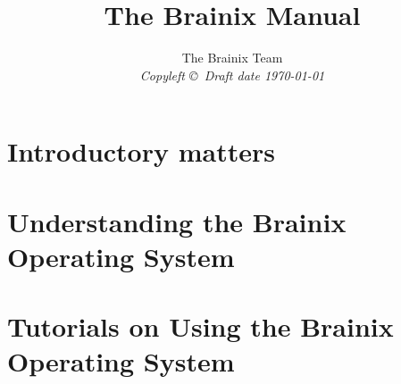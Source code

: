 \documentclass{book}
\title{The Brainix Manual}
\author{The Brainix Team  \\
{\small\em Copyleft \copyright \ Draft date \today }}
\date{ }
\begin{document}


\maketitle
\tableofcontents

%
\part{Introductory matters}

\part{Understanding the Brainix Operating System}


\part{Tutorials on Using the Brainix Operating System}



\end{document}
